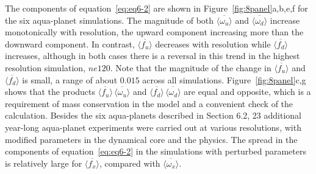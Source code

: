 The components of equation~\ref{eq:eq6-2} are shown in Figure~\ref{fig:8panel}a,b,e,f for the six aqua-planet simulations. The magnitude of both $\overline{\langle \omega_{u} \rangle}$ and $\overline{\langle \omega_{d} \rangle}$ increase monotonically with resolution, the upward component increasing more than the downward component. In contrast, $\overline{\langle f_{u} \rangle}$ decreases with resolution while $\overline{\langle f_{d} \rangle}$ increases, although in both cases there is a reversal in this trend in the highest resolution simulation, $ne120$. Note that the magnitude of the change in $\overline{\langle f_{u} \rangle}$ and $\overline{\langle f_{d} \rangle}$ is small, a range of about $0.015$ across all simulations. Figure~\ref{fig:8panel}c,g shows that the products  $\overline{\langle f_{u} \rangle} \, \overline{\langle \omega_{u} \rangle}$ and $\overline{\langle f_{d} \rangle} \, \overline{\langle \omega_{d} \rangle}$ are equal and opposite, which is a requirement of mass conservation in the model and a convenient check of the calculation. Besides the six aqua-planets described in Section 6.2, 23 additional year-long aqua-planet experiments were carried out at various resolutions, with modified parameters in the dynamical core and the physics. The spread in the components of equation~\ref{eq:eq6-2} in the simulations with perturbed parameters is relatively large for $\overline{\langle f_{x} \rangle}$, compared with $\overline{\langle \omega_{x} \rangle}$.

